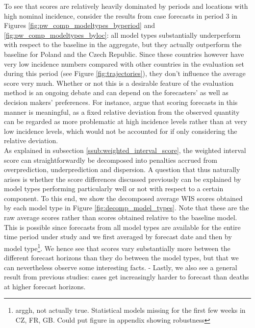 To see that scores are relatively heavily dominated by periods and locations with high nominal incidence, consider the results from case forecasts in period 3 in Figures \ref{fig:pw_comp_modeltypes_byperiod} and \ref{fig:pw_comp_modeltypes_byloc}: all model types substantially underperform with respect to the baseline in the aggregate, but they actually outperform the baseline for Poland and the Czech Republic. Since these countries however have very low incidence numbers compared with other countries in the evaluation set during this period (see Figure \ref{fig:trajectories}), they don't influence the average score very much. Whether or not this is a desirable feature of the evaluation method is an ongoing debate and can depend on the forecasters' as well as decision makers' preferences. For instance, \cite{bracher_evaluating_2021} argue that scoring forecasts in this manner is meaningful, as a fixed relative deviation from the observed quantity can be regarded as more problematic at high incidence levels rather than at very low incidence levels, which would not be accounted for if only considering the relative deviation.\\  
As explained in subsection \ref{ssub:weighted_interval_score}, the weighted interval score can straightforwardly be decomposed into penalties accrued from overprediction, underprediction and dispersion. A question that thus naturally arises is whether the score differences discussed previously can be explained by model types performing particularly well or not with respect to a certain component. To this end, we show the decomposed average WIS scores obtained by each model type in Figure \ref{fig:decomp_model_types}. Note that these are the raw average scores rather than scores obtained relative to the baseline model. This is possible since forecasts from all model types are available for the entire time period under study and we first averaged by forecast date and then by model type\footnote{arggh, not actually true. Statistical models missing for the first few weeks in CZ, FR, GB. Could put figure in appendix showing robustness}. We hence see that scores vary substantially more between the different forecast horizons than they do between the model types, but that we can nevertheless observe some interesting facts. 
- Lastly, we also see a general result from previous studies: cases get increasingly harder to forecast than deaths at higher forecast horizons.\\
